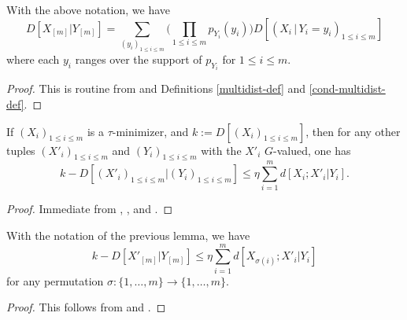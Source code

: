 \begin{lemma}\label{cond-multidist-alt}\leanok  With the above notation, we have
  \begin{equation}\label{multi-def-cond-alt}
    D[ X_{[m]} | Y_{[m]} ] = \sum_{(y_i)_{1 \leq i \leq m}} \biggl(\prod_{1 \leq i \leq m} p_{Y_i}(y_i)\biggr) D[ (X_i \,|\, Y_i \mathop{=}y_i)_{1 \leq i \leq m}]
  \end{equation}
  where each $y_i$ ranges over the support of $p_{Y_i}$ for $1 \leq i \leq m$.
\end{lemma}

\begin{proof}
  This is routine from  and Definitions \ref{multidist-def} and \ref{cond-multidist-def}.
\end{proof}

\begin{lemma}\label{cond-multidist-lower}  If  $(X_i)_{1 \leq i \leq m}$ is a $\tau$-minimizer, and $k := D[(X_i)_{1 \leq i \leq m}]$, then for any other tuples $(X'_i)_{1 \leq i \leq m}$ and $(Y_i)_{1 \leq i \leq m}$ with the $X'_i$ $G$-valued, one has
  $$ k - D[(X'_i)_{1 \leq i \leq m} | (Y_i)_{1 \leq i \leq m}] \leq \eta \sum_{i=1}^m d[X_i; X'_i|Y_i].$$
\end{lemma}

\begin{proof}
  Immediate from , , and .
\end{proof}

\begin{corollary}\label{cond-multidist-lower-II} With the notation of the previous lemma, we have
  \begin{equation}\label{5.3-conv}
    k - D[ X'_{[m]} | Y_{[m]} ] \leq \eta \sum_{i=1}^m d[X_{\sigma(i)};X'_i|Y_i]
  \end{equation}
for any permutation $\sigma : \{1,\dots,m\} \rightarrow \{1,\dots,m\}$.
\end{corollary}

\begin{proof}  This follows from  and .
\end{proof}

